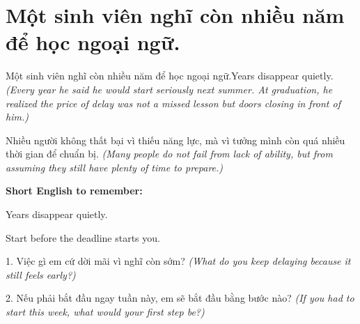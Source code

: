 \section{Một sinh viên nghĩ còn nhiều năm để học ngoại ngữ.}
\begin{truyen}{Một sinh viên nghĩ còn nhiều năm để học ngoại ngữ.}{Years disappear quietly.}
\textit{(Every year he said he would start seriously next summer. At graduation, he realized the price of delay was not a missed lesson but doors closing in front of him.)}
\end{truyen}
\begin{baihoc}
Nhiều người không thất bại vì thiếu năng lực, mà vì tưởng mình còn quá nhiều thời gian để chuẩn bị.
\textit{(Many people do not fail from lack of ability, but from assuming they still have plenty of time to prepare.)}
\end{baihoc}
\begin{ghinhoanh}
\textbf{Short English to remember:}

Years disappear quietly.

Start before the deadline starts you.
\end{ghinhoanh}
\begin{tuhocnhanh}
1. Việc gì em cứ dời mãi vì nghĩ còn sớm? \textit{(What do you keep delaying because it still feels early?)}

2. Nếu phải bắt đầu ngay tuần này, em sẽ bắt đầu bằng bước nào? \textit{(If you had to start this week, what would your first step be?)}
\end{tuhocnhanh}
\ngancach

